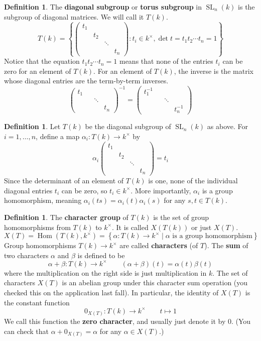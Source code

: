\documentclass[12pt]{article}
\theoremstyle{definition}
\newtheorem{definition}[theorem]{Definition}
\numberwithin{theorem}{subsection}
\newcommand{\lb}{\left\{}
\newcommand{\rb}{\right\}}
\newcommand{\tbf}{\textbf}
\newcommand{\inv}{^{-1}}
\DeclareMathOperator{\Hom}{Hom}
\DeclareMathOperator{\SL}{SL}
\begin{document}
\begin{definition}
The \tbf{diagonal subgroup} or \tbf{torus subgroup} in $\SL_n(k)$ is the subgroup of diagonal matrices. We will call it $T(k)$.
\[
	T(k) =
	\lb
	\begin{pmatrix}
		t_1 \\
		& t_2 \\
		&& \ddots \\
		&&& t_n
	\end{pmatrix}
	: t_i \in k^\times, \det t = t_1 t_2 \cdots t_n = 1
	\rb
\]
Notice that the equation $t_1 t_2 \cdots t_n = 1$ means that none of the entries $t_i$ can be zero for an element of $T(k)$. For an element of $T(k)$, the inverse is the matrix whose diagonal entries are the term-by-term inverses.
\[
	\begin{pmatrix}
		t_1 \\
		&& \ddots \\
		&&& t_n
	\end{pmatrix}
	\inv
	=
	\begin{pmatrix}
		t_1 \inv \\
		&& \ddots \\
		&&& t_n \inv
	\end{pmatrix}
\]

\begin{definition}
Let $T(k)$ be the diagonal subgroup of $\SL_n(k)$ as above. For $i=1, \ldots, n$, define a map $\alpha_i:T(k) \to k^\times$ by
\[
	\alpha_i
	\begin{pmatrix}
		t_1 \\
		& t_2 \\
		&& \ddots \\
		&&& t_n
	\end{pmatrix}
	= t_i
\]
Since the determinant of an element of $T(k)$ is one, none of the individual diagonal entries $t_i$ can be zero, so $t_i \in k^\times$. More importantly, $\alpha_i$ is a group homomorphism, meaning $\alpha_i(ts) = \alpha_i(t) \alpha_i(s)$ for any $s,t \in T(k)$.
\end{definition}

\begin{definition}
The \tbf{character group} of $T(k)$ is the set of group homomorphisms from $T(k)$ to $k^\times$. It is called $X(T(k))$ or just $X(T)$.
\[
	X(T) = \Hom(T(k), k^\times) = \lb \alpha:T(k) \to k^\times \mid \alpha \text{ is a group homomorphism} \rb
\]
Group homomorphisms $T(k) \to k^\times$ are called \tbf{characters} (of $T$). The \tbf{sum} of two characters $\alpha$ and $\beta$ is defined to be
\[
	\alpha+\beta:T(k) \to k^\times \qquad (\alpha+\beta)(t) = \alpha(t)  \beta(t)
\]
where the multiplication on the right side is just multiplication in $k$. The set of characters $X(T)$ is an abelian group under this character sum operation (you checked this on the application last fall). In particular, the identity of $X(T)$ is the constant function
\[
	0_{X(T)}:T(k) \to k^\times \qquad t \mapsto 1
\]
We call this function the \tbf{zero character}, and usually just denote it by $0$. (You can check that $\alpha + 0_{X(T)} = \alpha$ for any $\alpha \in X(T)$.)
\end{definition}


\end{definition}
\end{document}
